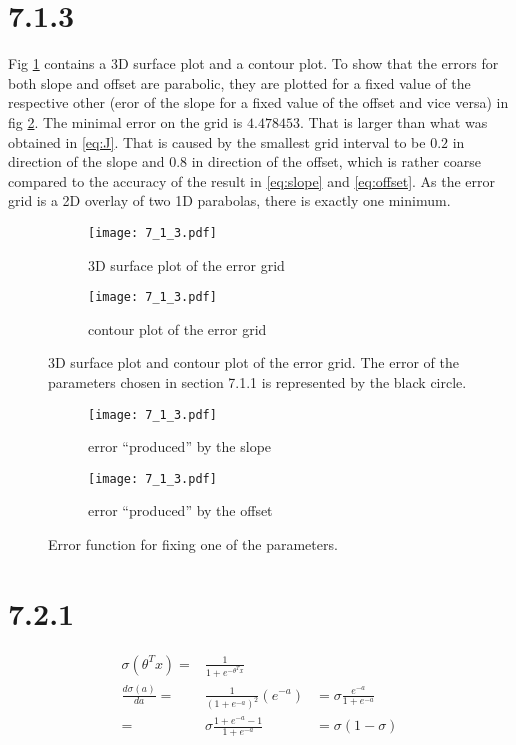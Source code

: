\documentclass[a4paper,11pt]{article}
\theoremstyle{definition}
\theoremstyle{plain}
\theoremstyle{remark}
\begin{document}
\section*{7.1.3}
Fig \ref{fig:surf} contains a 3D surface plot and a contour plot. To show that the errors for both slope and offset are parabolic, they are plotted for a fixed value of the respective other (eror of the slope for a fixed value of the offset and vice versa) in fig \ref{fig:fixed}. The minimal error on the grid is $4.478453$. That is larger than what was obtained in \ref{eq:J}. That is caused by the smallest grid interval to be $0.2$ in direction of the slope and $0.8$ in direction of the offset, which is rather coarse compared to the accuracy of the result in \ref{eq:slope} and \ref{eq:offset}. As the error grid is a 2D overlay of two 1D parabolas, there is exactly one minimum.

\begin{figure}[H]
\centering
\begin{subfigure}{0.45\textwidth}
\texttt{[image: 7\_1\_3.pdf]}
\caption{3D surface plot of the error grid}
\end{subfigure}
\hfill
\begin{subfigure}{0.45\textwidth}
\texttt{[image: 7\_1\_3.pdf]}
\caption{contour plot of the error grid}
\end{subfigure}
\caption{3D surface plot and contour plot of the error grid. The error of the parameters chosen in section 7.1.1 is represented by the black circle.}
\label{fig:surf}
\end{figure}
\begin{figure}[H]
\centering
\begin{subfigure}{0.45\textwidth}
\texttt{[image: 7\_1\_3.pdf]}
\caption{error ``produced'' by the slope}
\end{subfigure}
\hfill
\begin{subfigure}{0.45\textwidth}
\texttt{[image: 7\_1\_3.pdf]}
\caption{error ``produced'' by the offset}
\end{subfigure}
\caption{Error function for fixing one of the parameters.}
\label{fig:fixed}
\end{figure}

\section*{7.2.1}

\begin{align}
\sigma(\theta^Tx) = &\frac{1}{1+e^{-\theta^Tx}}& \\
\frac{d\sigma(a)}{da} = &\frac{1}{(1+e^{-a})^2}(e^{-a})& = \sigma\frac{e^{-a}}{1+e^{-a}} \\
= & \sigma\frac{1+e^{-a}-1}{1+e^{-a}}& = \sigma(1-\sigma)
\end{align}
\end{document}
